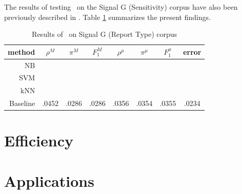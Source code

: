 The results of testing \aicat\ on the Signal G (Sensitivity) corpus
have also been previously described in \cite{calvo:02}.  Table
\ref{signalg-rt-results} summarizes the present findings.

\begin{table}
\begin{center}
\begin{tabular}{|r c c c c c c c|}
\hline
method    & $\rho^M$ & $\pi^M$ & $F_1^M$ & $\rho^\mu$ & $\pi^\mu$ & $F_1^\mu$ &   error \\
\hline
NB        \\
SVM       \\
kNN       \\
Baseline  &   .0452  &  .0286  &  .0286  &  .0356     &  .0354    &  .0355    &  .0234  \\
\hline
\end{tabular}
\end{center}
\caption{Results of \aicat\ on Signal G (Report Type) corpus}
\label{signalg-rt-results}
\end{table}

\section{Efficiency}
\label{Efficiency}

\section{Applications}
\label{Applications}
